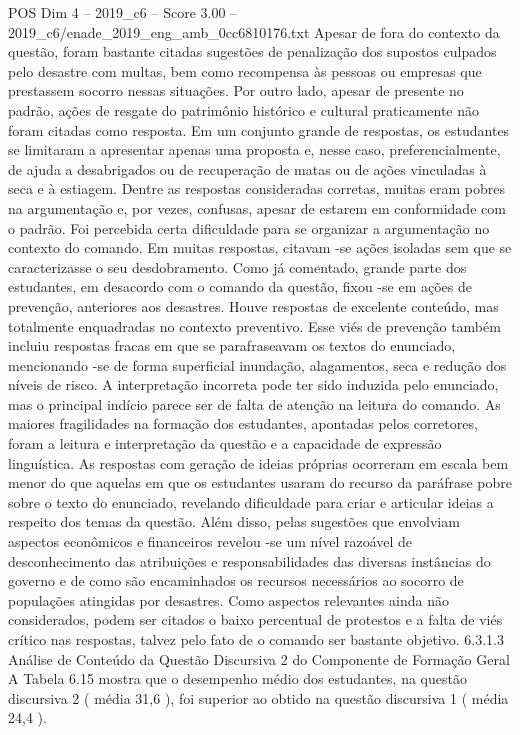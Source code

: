 \begin{textsample}{POS Dim 4 – 2019\_c6 – Score 3.00 – 2019\_c6/enade\_2019\_eng\_amb\_0cc6810176.txt}
Apesar de fora do contexto da questão, foram bastante citadas sugestões de penalização dos supostos culpados pelo desastre com multas, bem como recompensa às pessoas ou empresas que prestassem socorro nessas situações.
Por outro lado, apesar de presente no padrão, ações de resgate do patrimônio histórico e cultural praticamente não foram citadas como resposta.
Em um conjunto grande de respostas, os estudantes se limitaram a apresentar apenas uma proposta e, nesse caso, preferencialmente, de ajuda a desabrigados ou de recuperação de matas ou de ações vinculadas à seca e à estiagem.
Dentre as respostas consideradas corretas, muitas eram pobres na argumentação e, por vezes, confusas, apesar de estarem em conformidade com o padrão.
Foi percebida certa dificuldade para se organizar a argumentação no contexto do comando.
Em muitas respostas, citavam -se ações isoladas sem que se caracterizasse o seu desdobramento.
Como já comentado, grande parte dos estudantes, em desacordo com o comando da questão, fixou -se em ações de prevenção, anteriores aos desastres.
Houve respostas de excelente conteúdo, mas totalmente enquadradas no contexto preventivo.
Esse viés de prevenção também incluiu respostas fracas em que se parafraseavam os textos do enunciado, mencionando -se de forma superficial inundação, alagamentos, seca e redução dos níveis de risco.
A interpretação incorreta pode ter sido induzida pelo enunciado, mas o principal indício parece ser de falta de atenção na leitura do comando.
As maiores fragilidades na formação dos estudantes, apontadas pelos corretores, foram a leitura e interpretação da questão e a capacidade de expressão linguística.
As respostas com geração de ideias próprias ocorreram em escala bem menor do que aquelas em que os estudantes usaram do recurso da paráfrase pobre sobre o texto do enunciado, revelando dificuldade para criar e articular ideias a respeito dos temas da questão.
Além disso, pelas sugestões que envolviam aspectos econômicos e financeiros revelou -se um nível razoável de desconhecimento das atribuições e responsabilidades das diversas instâncias do governo e de como são encaminhados os recursos necessários ao socorro de populações atingidas por desastres.
Como aspectos relevantes ainda não considerados, podem ser citados o baixo percentual de protestos e a falta de viés crítico nas respostas, talvez pelo fato de o comando ser bastante objetivo. 6.3.1.3 Análise de Conteúdo da Questão Discursiva 2 do Componente de Formação Geral A Tabela 6.15 mostra que o desempenho médio dos estudantes, na questão discursiva 2 ( média 31,6 ), foi superior ao obtido na questão discursiva 1 ( média 24,4 ).

\end{textsample}
